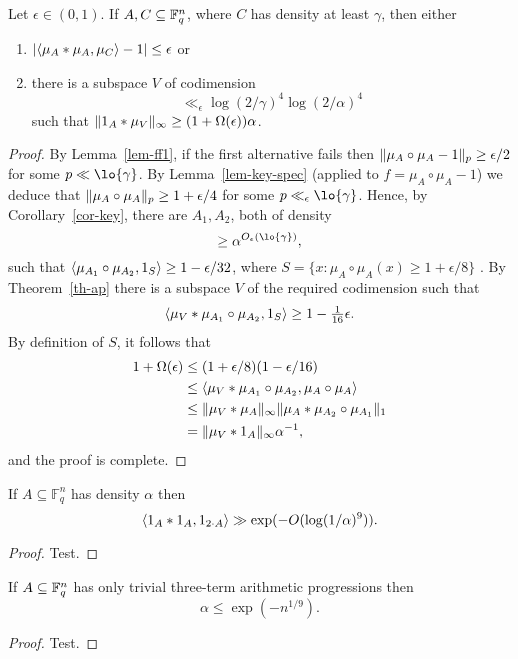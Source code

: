 \begin{proposition}\label{di_in_ff}
Let $\epsilon \in (0,1)$. If $A,C\subseteq \mathbb{F}_q^n$, where $C$ has density at least $\gamma$, then either
\begin{enumerate}
\item $\left\lvert \langle \mu_A\ast \mu_A,\mu_C\rangle -1\right\rvert\leq \epsilon$ or
\item there is a subspace $V$ of codimension 
\[\ll_\epsilon \log(2/\gamma)^4\log(2/\alpha)^4\]
such that $\lVert 1_{A}\ast \mu_V\rVert_\infty \geq (1+\Omega(\epsilon))\alpha$.
\end{enumerate}
\end{proposition}
\begin{proof}
By Lemma~\ref{lem-ff1}, if the first alternative fails then $\lVert \mu_A\circ \mu_A-1\rVert_p\geq \epsilon/2$ for some $p\ll \lo{\gamma}$. By Lemma~\ref{lem-key-spec} (applied to $f=\mu_A\circ \mu_A-1$) we deduce that $\lVert \mu_A\circ \mu_A\rVert_p\geq 1+\epsilon/4$ for some $p\ll_\epsilon \lo{\gamma}$. Hence, by Corollary~\ref{cor-key}, there are $A_1,A_2$, both of density 
\[\geq \alpha^{O_\epsilon(\lo{\gamma})},\]
such that $\langle \mu_{A_1}\circ \mu_{A_2},1_{S}\rangle \geq 1-\epsilon/32$, where $S=\{x : \mu_A\circ \mu_A(x)\geq 1+\epsilon/8\}$ . By Theorem~\ref{th-ap} there is a subspace $V$ of the required codimension such that
\[\langle \mu_V\ast \mu_{A_1}\circ \mu_{A_2},1_{S}\rangle \geq 1-\tfrac{1}{16}\epsilon.\]
By definition of $S$, it follows that
\begin{align*}
1+\Omega(\epsilon)
&\leq (1+\epsilon/8)(1-\epsilon/16)\\
&\leq \langle \mu_V\ast \mu_{A_1}\circ \mu_{A_2},\mu_A\circ \mu_A\rangle\\
&\leq \lVert \mu_V\ast \mu_A\rVert_\infty \lVert \mu_{A}\ast \mu_{A_2}\circ \mu_{A_1}\rVert_1\\
&= \lVert \mu_V\ast 1_{A}\rVert_\infty \alpha^{-1},
\end{align*}
and the proof is complete.
\end{proof}

\begin{theorem}\label{3aps_in_ff_count}
If $A\subseteq \mathbb{F}_q^n$ has density $\alpha$ then
\[\langle 1_{A}\ast 1_{A},1_{2\cdot A}\rangle \gg \exp(-O(\log(1/\alpha)^9)).\]
\end{theorem}
\begin{proof}
Test.
\end{proof}

\begin{theorem}\label{3aps_in_ff}
If $A\subseteq \mathbb{F}_q^n$ has only trivial three-term arithmetic progressions then
\[\alpha \leq \exp(-n^{1/9}).\]
\end{theorem}
\begin{proof}
Test.
\end{proof}